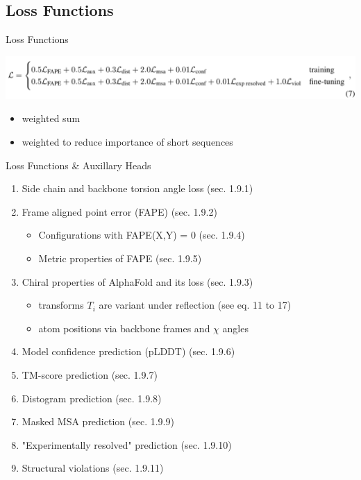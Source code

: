 \documentclass[presentation, smaller]{beamer}
\begin{document}
\subsection*{Loss Functions}
\label{sec:org0e74be0}
\begin{frame}[label={sec:org447ccae}]{Loss Functions  \cite{jumperHighlyAccurateProtein2021}}
\begin{center}
\includegraphics[width=.9\linewidth]{./imgs/loss-eq.png}
\end{center}

\begin{itemize}
\item weighted sum
\item weighted to reduce importance of short sequences
\end{itemize}
\end{frame}

\begin{frame}[label={sec:org8450db3}]{Loss Functions \& Auxillary Heads \cite{jumperHighlyAccurateProtein2021}}
\begin{enumerate}
\item Side chain and backbone torsion angle loss (sec. 1.9.1)
\item Frame aligned point error (FAPE) (sec. 1.9.2)
\begin{itemize}
\item Configurations with FAPE(X,Y) = 0 (sec. 1.9.4)
\item Metric properties of FAPE (sec. 1.9.5)
\end{itemize}
\item Chiral properties of AlphaFold and its loss (sec. 1.9.3)
\begin{itemize}
\item transforms \(T_i\) are variant under reflection (see eq. 11 to 17)
\item atom positions via backbone frames and \(\chi\) angles
\end{itemize}
\item Model confidence prediction (pLDDT) (sec. 1.9.6)
\item TM-score prediction (sec. 1.9.7)
\item Distogram prediction (sec. 1.9.8)
\item Masked MSA prediction (sec. 1.9.9)
\item "Experimentally resolved" prediction (sec. 1.9.10)
\item Structural violations (sec. 1.9.11)
\end{enumerate}
\end{frame}
\end{document}
